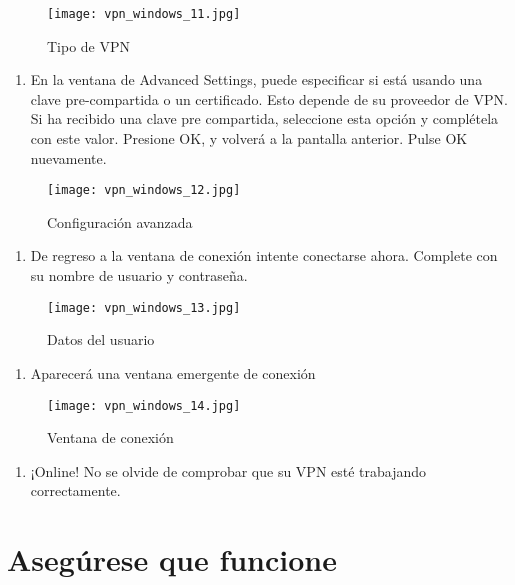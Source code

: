 \documentclass[10pt,a5paper,twoside,,]{book}
\providecommand{\tightlist}{%
  \setlength{\itemsep}{0pt}\setlength{\parskip}{0pt}}
\begin{document}
\begin{figure}[htbp]
\centering
\texttt{[image: vpn\_windows\_11.jpg]}
\caption{Tipo de VPN}
\end{figure}

\begin{enumerate}
\def\labelenumi{\arabic{enumi}.}
\setcounter{enumi}{12}
\tightlist
\item
  En la ventana de Advanced Settings, puede especificar si está usando
  una clave pre-compartida o un certificado. Esto depende de su
  proveedor de VPN. Si ha recibido una clave pre compartida, seleccione
  esta opción y complétela con este valor. Presione OK, y volverá a la
  pantalla anterior. Pulse OK nuevamente.
\end{enumerate}

\begin{figure}[htbp]
\centering
\texttt{[image: vpn\_windows\_12.jpg]}
\caption{Configuración avanzada}
\end{figure}

\begin{enumerate}
\def\labelenumi{\arabic{enumi}.}
\setcounter{enumi}{13}
\tightlist
\item
  De regreso a la ventana de conexión intente conectarse ahora. Complete
  con su nombre de usuario y contraseña.
\end{enumerate}

\begin{figure}[htbp]
\centering
\texttt{[image: vpn\_windows\_13.jpg]}
\caption{Datos del usuario}
\end{figure}

\begin{enumerate}
\def\labelenumi{\arabic{enumi}.}
\setcounter{enumi}{14}
\tightlist
\item
  Aparecerá una ventana emergente de conexión
\end{enumerate}

\begin{figure}[htbp]
\centering
\texttt{[image: vpn\_windows\_14.jpg]}
\caption{Ventana de conexión}
\end{figure}

\begin{enumerate}
\def\labelenumi{\arabic{enumi}.}
\setcounter{enumi}{15}
\tightlist
\item
  ¡Online! No se olvide de comprobar que su VPN esté trabajando
  correctamente.
\end{enumerate}

\chapter{Asegúrese que funcione}\label{aseguxfarese-que-funcione}
\end{document}
